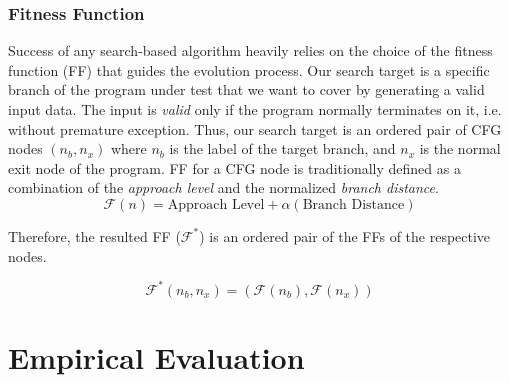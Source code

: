 \documentclass[sigconf]{acmart}
\begin{document}
\subsubsection{Fitness Function}
\label{sub.sub.sec.fitness.fun}

Success of any search-based algorithm heavily relies on the choice of the fitness function (FF) that guides the evolution process. Our search target is a specific branch of the program under test that we want to cover by generating a valid input data. The input is \emph{valid} only if the program normally terminates on it, i.e. without premature exception. Thus, our search target is an ordered pair of CFG nodes $(n_b, n_x)$ where $n_b$ is the label of the target branch, and $n_x$ is the normal exit node of the program. FF for a CFG node is traditionally defined as a combination of the \emph{approach level} and the normalized \emph{branch distance}\cite{arcuri2010does}. 
\[
\mathcal{F}(n) = \text{Approach Level} + \alpha({\text{Branch Distance}})
\]

Therefore, the resulted FF ($\mathcal{F}^*$) is an ordered pair of the FFs of the respective nodes.   

\[
\mathcal{F}^*(n_b, n_x) = (\mathcal{F}(n_b), \mathcal{F}(n_x))
\]

\section{Empirical Evaluation}
\label{sec.evaluation}
\end{document}
